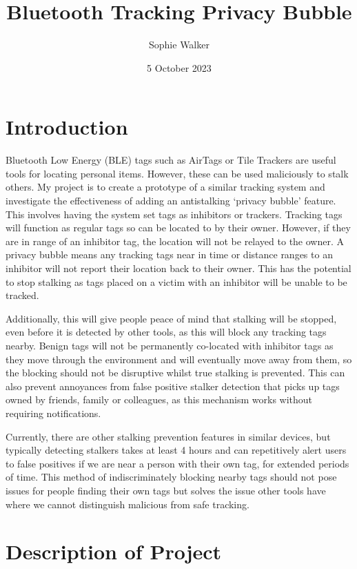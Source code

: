 \documentclass{article}
\begin{document}
\title{Bluetooth Tracking Privacy Bubble}
\author{Sophie Walker}
\date{5 October 2023}
\maketitle
\thispagestyle{empty}
\section{Introduction}


Bluetooth Low Energy (BLE) tags such as AirTags or Tile Trackers are useful tools for locating personal items. However, these can be used maliciously to stalk others. My project is to create a prototype of a similar tracking system and investigate the effectiveness of adding an antistalking  `privacy bubble' feature. This involves having the system set tags as inhibitors or trackers. Tracking tags will function as  regular tags  so can be located to by their owner. However, if they are in range of an inhibitor tag, the location will not be relayed to the owner. A privacy bubble means any tracking tags near in time or distance ranges to an inhibitor will not report their location back to their owner. This has the potential to stop stalking as tags placed on a victim with an inhibitor will be unable to be tracked.
\par

Additionally, this will give people peace of mind that stalking will be stopped, even before it is detected by other tools, as this will block any tracking tags nearby. Benign tags will not be permanently co-located with inhibitor tags as they move through the environment and will eventually move away from them, so the blocking should not be disruptive whilst true stalking is prevented. This can also prevent annoyances from false positive stalker detection that picks up tags owned by friends, family or colleagues, as this mechanism works without requiring notifications.
\par
Currently, there are other stalking prevention features in similar devices, but typically detecting stalkers takes at least 4 hours \cite{Failuresof ASProtocols} and can repetitively alert users to false positives if we are near a person with their own tag, for extended periods of time. This method of indiscriminately blocking nearby tags should not pose issues for people finding their own tags but solves the issue other tools have where we cannot distinguish malicious from safe tracking.


\section{Description of Project}
\end{document}
